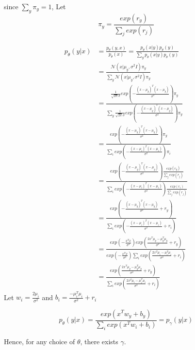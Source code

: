 \documentclass[12pt]{article}
\begin{document}
since $\sum_y \pi_y = 1$, Let
 \begin{equation}
 \pi_y = \frac {exp(r_y)}{\sum_j exp(r_j)}
\end{equation}

 \begin{equation}
\begin{split}
p_{\theta} (y|x) &= \frac{p_{\theta} (y, x)}{p_{\theta} (x)} =  \frac{p_{\theta} (x | y) p_{\theta} (y) }{ \sum_{y} {p_{\theta} (x | y) p_{\theta} (y) }  }  \\
&=  \frac{ \mathcal{N} (x | \mu_y, \sigma^2 I)  \pi_y}{ \sum_{y} {\mathcal{N} (x | \mu_y, \sigma^2 I)  \pi_y}} \\
&= \frac {\frac{1}{\sqrt{2\pi} \sigma} exp (-\frac{(x- \mu_y)^T(x- \mu_y)}{\sigma^2}) \pi_y }{\sum_y{ \frac{1}{\sqrt{2\pi} \sigma} exp (-\frac{(x- \mu_y)^T(x- \mu_y)}{\sigma^2}) \pi_y   }} \\
& = \frac { exp (-\frac{(x- \mu_y)^T(x- \mu_y)}{\sigma^2}) \pi_y }{\sum_i {exp (-\frac{(x- \mu_i)^T(x- \mu_i)}{\sigma^2}) \pi_i }    } \\
& = \frac { exp (-\frac{(x- \mu_y)^T(x- \mu_y)}{\sigma^2}) \frac {exp(r_y)}{\sum_j exp(r_j)} }{\sum_i {exp (-\frac{(x- \mu_i)^T(x- \mu_i)}{\sigma^2}) \frac {exp(r_i)}{\sum_j exp(r_j)}}    } \\ 
&= \frac { exp (-\frac{(x- \mu_y)^T(x- \mu_y)}{\sigma^2} + r_y) }{\sum_i {exp (-\frac{(x- \mu_i)^T(x- \mu_i)}{\sigma^2} + r_i) }  } \\
&= \frac{exp (-\frac{x^Tx}{\sigma^2}) exp (\frac{ 2x^T\mu_y - \mu_y^T\mu_y     }{\sigma^2} + r_y)}{ exp (-\frac{x^Tx}{\sigma^2}) \sum_i { exp (\frac{ 2x^T\mu_i - \mu_i^T\mu_i     }{\sigma^2} + r_i)}        } \\ 
&= \frac{exp (\frac{ 2x^T\mu_y - \mu_y^T\mu_y     }{\sigma^2} + r_y)}{ \sum_i { exp (\frac{ 2x^T\mu_i - \mu_i^T\mu_i    }{\sigma^2} + r_i)}        }
\end{split}
\end{equation}
Let $w_i =  \frac{2\mu_i }{\sigma^2} $ and $b_i = \frac{ - \mu_i^T\mu_i  }{\sigma^2} + r_i$

\begin{equation}
	p_{\theta} (y|x) = \frac{exp(x^T w_y + b_y)}{\sum_i{exp(x^T w_i + b_i)}} = p_{\gamma}(y|x)
\end{equation}

Hence, for any choice of $\theta$, there exists $\gamma$.
\end{document}
